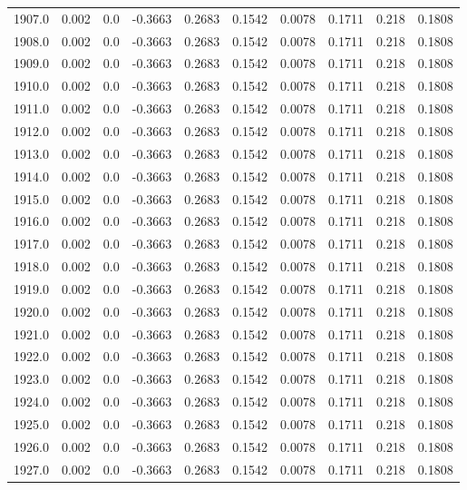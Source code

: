 \begin{longtable}{lrrrrrrrrr}
1907.0 & 0.002 & 0.0 & -0.3663 & 0.2683 & 0.1542 & 0.0078 & 0.1711 & 0.218 & 0.1808 \\
1908.0 & 0.002 & 0.0 & -0.3663 & 0.2683 & 0.1542 & 0.0078 & 0.1711 & 0.218 & 0.1808 \\
1909.0 & 0.002 & 0.0 & -0.3663 & 0.2683 & 0.1542 & 0.0078 & 0.1711 & 0.218 & 0.1808 \\
1910.0 & 0.002 & 0.0 & -0.3663 & 0.2683 & 0.1542 & 0.0078 & 0.1711 & 0.218 & 0.1808 \\
1911.0 & 0.002 & 0.0 & -0.3663 & 0.2683 & 0.1542 & 0.0078 & 0.1711 & 0.218 & 0.1808 \\
1912.0 & 0.002 & 0.0 & -0.3663 & 0.2683 & 0.1542 & 0.0078 & 0.1711 & 0.218 & 0.1808 \\
1913.0 & 0.002 & 0.0 & -0.3663 & 0.2683 & 0.1542 & 0.0078 & 0.1711 & 0.218 & 0.1808 \\
1914.0 & 0.002 & 0.0 & -0.3663 & 0.2683 & 0.1542 & 0.0078 & 0.1711 & 0.218 & 0.1808 \\
1915.0 & 0.002 & 0.0 & -0.3663 & 0.2683 & 0.1542 & 0.0078 & 0.1711 & 0.218 & 0.1808 \\
1916.0 & 0.002 & 0.0 & -0.3663 & 0.2683 & 0.1542 & 0.0078 & 0.1711 & 0.218 & 0.1808 \\
1917.0 & 0.002 & 0.0 & -0.3663 & 0.2683 & 0.1542 & 0.0078 & 0.1711 & 0.218 & 0.1808 \\
1918.0 & 0.002 & 0.0 & -0.3663 & 0.2683 & 0.1542 & 0.0078 & 0.1711 & 0.218 & 0.1808 \\
1919.0 & 0.002 & 0.0 & -0.3663 & 0.2683 & 0.1542 & 0.0078 & 0.1711 & 0.218 & 0.1808 \\
1920.0 & 0.002 & 0.0 & -0.3663 & 0.2683 & 0.1542 & 0.0078 & 0.1711 & 0.218 & 0.1808 \\
1921.0 & 0.002 & 0.0 & -0.3663 & 0.2683 & 0.1542 & 0.0078 & 0.1711 & 0.218 & 0.1808 \\
1922.0 & 0.002 & 0.0 & -0.3663 & 0.2683 & 0.1542 & 0.0078 & 0.1711 & 0.218 & 0.1808 \\
1923.0 & 0.002 & 0.0 & -0.3663 & 0.2683 & 0.1542 & 0.0078 & 0.1711 & 0.218 & 0.1808 \\
1924.0 & 0.002 & 0.0 & -0.3663 & 0.2683 & 0.1542 & 0.0078 & 0.1711 & 0.218 & 0.1808 \\
1925.0 & 0.002 & 0.0 & -0.3663 & 0.2683 & 0.1542 & 0.0078 & 0.1711 & 0.218 & 0.1808 \\
1926.0 & 0.002 & 0.0 & -0.3663 & 0.2683 & 0.1542 & 0.0078 & 0.1711 & 0.218 & 0.1808 \\
1927.0 & 0.002 & 0.0 & -0.3663 & 0.2683 & 0.1542 & 0.0078 & 0.1711 & 0.218 & 0.1808 \\

\end{longtable}
